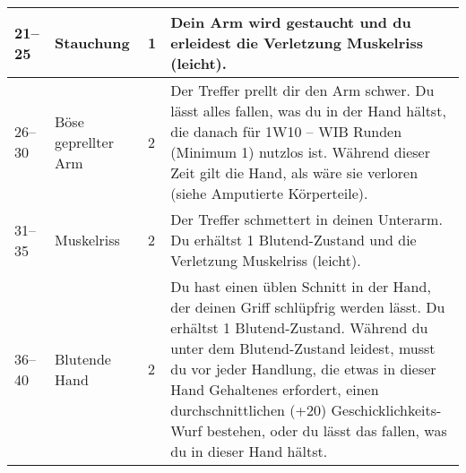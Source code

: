 \documentclass[a4paper, fontsize=8.5pt]{scrartcl}
\begin{document}
\begin{table}[!ht]
\begin{tabularx}{\textwidth}{lp{2.5cm}lX}
        21–25         & Stauchung                  & 1           & Dein Arm wird gestaucht und du erleidest die Verletzung Muskelriss (leicht).                                                                                                                                                                                                                                                                                                                                                                                                                                                                                                                                                                               \\ \hline
        26–30         & Böse geprellter Arm        & 2           & Der Treffer prellt dir den Arm schwer. Du lässt alles fallen, was du in der Hand hältst, die danach für 1W10 – WIB Runden (Minimum 1) nutzlos ist. Während dieser Zeit gilt die Hand, als wäre sie verloren (siehe Amputierte Körperteile).                                                                                                                                                                                                                                                                                                                                                                                                                \\ \hline
        31–35         & Muskelriss                 & 2           & Der Treffer schmettert in deinen Unterarm. Du erhältst 1 Blutend-Zustand und die Verletzung Muskelriss (leicht).                                                                                                                                                                                                                                                                                                                                                                                                                                                                                                                                           \\ \hline
        36–40         & Blutende Hand              & 2           & Du hast einen üblen Schnitt in der Hand, der deinen Griff schlüpfrig werden lässt. Du erhältst 1 Blutend-Zustand. Während du unter dem Blutend-Zustand leidest, musst du vor jeder Handlung, die etwas in dieser Hand Gehaltenes erfordert, einen durchschnittlichen (+20) Geschicklichkeits-Wurf bestehen, oder du lässt das fallen, was du in dieser Hand hältst.                                                                                                                                                                                                                                                                                        \\ \hline

\end{tabularx}
\end{table}
\end{document}
